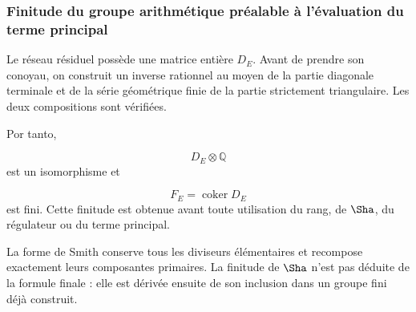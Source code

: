 \subsubsection{Finitude du groupe arithmétique préalable à l’évaluation du terme principal}
Le réseau résiduel possède une matrice entière \(D_E\). Avant de prendre son conoyau, on construit un inverse rationnel au moyen de la partie diagonale terminale et de la série géométrique finie de la partie strictement triangulaire. Les deux compositions sont vérifiées.\par
{}
Por tanto,\par
\[
D_E\otimes\mathbb Q
\]
est un isomorphisme et\par
\[
F_E=\operatorname{coker}D_E
\]
est fini. Cette finitude est obtenue avant toute utilisation du rang, de \(\Sha\), du régulateur ou du terme principal.\par
La forme de Smith conserve tous les diviseurs élémentaires et recompose exactement leurs composantes primaires. La finitude de \(\Sha\) n’est pas déduite de la formule finale : elle est dérivée ensuite de son inclusion dans un groupe fini déjà construit.\par
{}
